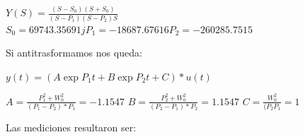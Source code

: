 \documentclass[12pt,a4paper]{article}
\begin{document}
\begin{center}
    $Y(S) = \frac{(S-S_{0})(S+S_{0})}{(S-P_{1})(S-P_{2})S}$  \\
    
    $S_{0}=69743.35691j
    P_{1}=-18687.67616
    P_{2}=-260285.7515$
    \end{center}

Si antitrasformamos nos queda:\\

\begin{center}
    $y(t) = (A\exp{P_{1}t}+B\exp{P_{2}t}+C) * u(t)$

    $A = \frac{P_{1}^2 + W_{0}^2}{(P_{1}-P_{2})*P_{1}} = -1.1547$
    $B = \frac{P_{2}^2 + W_{0}^2}{(P_{2}-P_{1})*P_{2}} =  1.1547$
    $C = \frac{W_{0}^2}{(P_{2}P_{1}} = 1$

    \end{center}



Las mediciones resultaron ser:
\end{document}
